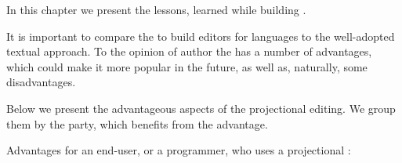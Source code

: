 

In this chapter we present the lessons, learned while building \pcpp.



  It is important to compare the  to build editors for languages to the well-adopted 
  textual approach. To the opinion of author the  has a number of advantages, 
  which could make it more popular in the future, as well as, naturally, some disadvantages.
  
  Below we present the advantageous aspects of the projectional editing. We group them by the party, 
  which benefits from the advantage.
  
  Advantages for an end-user, or a programmer, who uses a projectional :
  

